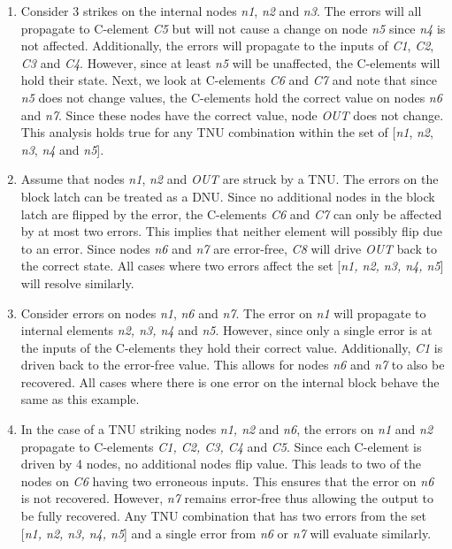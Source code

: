 \begin{enumerate}
	\item Consider 3 strikes on the internal nodes \textit{n1}, \textit{n2} and \textit{n3}. The errors will all propagate to C-element \textit{C5} but will not cause a change on node \textit{n5} since \textit{n4} is not affected. Additionally, the errors will propagate to the inputs of \textit{C1}, \textit{C2}, \textit{C3} and \textit{C4}. However, since at least \textit{n5} will be unaffected, the C-elements will hold their state. Next, we look at C-elements \textit{C6} and \textit{C7} and note that since \textit{n5} does not change values, the C-elements hold the correct value on nodes \textit{n6} and \textit{n7}. Since these nodes have the correct value, node \textit{OUT} does not change. This analysis holds true for any TNU combination within the set of [\textit{n1}, \textit{n2}, \textit{n3}, \textit{n4} and \textit{n5}].
	
	\item Assume that nodes \textit{n1}, \textit{n2} and \textit{OUT} are struck by a TNU. The errors on the block latch can be treated as a DNU. Since no additional nodes in the block latch are flipped by the error, the C-elements \textit{C6} and \textit{C7} can only be affected by at most two errors. This implies that neither element will possibly flip due to an error. Since nodes \textit{n6} and \textit{n7} are error-free, \textit{C8} will drive \textit{OUT} back to the correct state. All cases where two errors affect the set [\textit{n1, n2, n3, n4, n5}] will resolve similarly.
	
	\item Consider errors on nodes \textit{n1}, \textit{n6} and \textit{n7}. The error on \textit{n1} will propagate to internal elements \textit{n2, n3, n4} and \textit{n5}. However, since only a single error is at the inputs of the C-elements they hold their correct value. Additionally, \textit{C1} is driven back to the error-free value. This allows for nodes \textit{n6} and \textit{n7} to also be recovered. All cases where there is one error on the internal block behave the same as this example. 
	
	\item In the case of a TNU striking nodes \textit{n1, n2} and \textit{n6}, the errors on \textit{n1} and \textit{n2} propagate to C-elements \textit{C1, C2, C3, C4} and \textit{C5}. Since each C-element is driven by 4 nodes, no additional nodes flip value. This leads to two of the nodes on \textit{C6} having two erroneous inputs. This ensures that the error on \textit{n6} is not recovered. However, \textit{n7} remains error-free thus allowing the output to be fully recovered. Any TNU combination that has two errors from the set [\textit{n1, n2, n3, n4, n5}] and a single error from \textit{n6} or \textit{n7} will evaluate similarly.
	

\end{enumerate}

